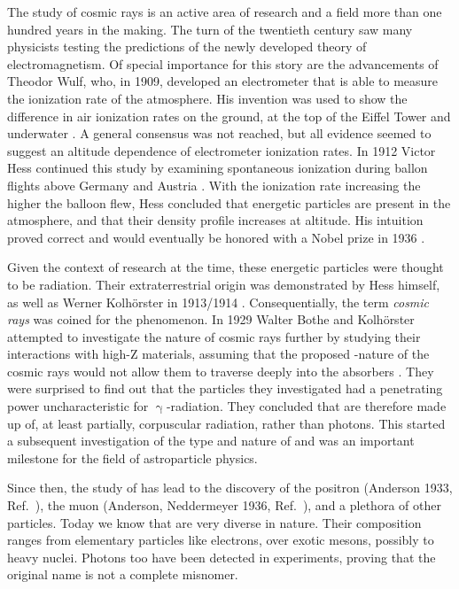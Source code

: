 The study of cosmic rays is an active area of research and a field more than 
one hundred years in the making. The turn of the twentieth century saw many 
physicists testing the predictions of the newly developed theory of 
electromagnetism. Of special importance for this story are the advancements of 
Theodor Wulf, who, in 1909, developed an electrometer that is able to measure 
the ionization rate of the atmosphere. His invention was used to show the 
difference in air ionization rates on the ground, at the top of the Eiffel 
Tower \cite{wulfBeobachtungenUberStrahlung1910} and underwater
\cite{paciniRadiazionePenetranteAlla1912}. A general consensus was not reached,
but all evidence seemed to suggest an altitude dependence of electrometer 
ionization rates. In 1912 Victor Hess continued this study by examining 
spontaneous ionization during ballon flights above Germany and Austria 
\cite{hessElektrischeLeitfaehigkeitAtmosphaere1926}. With the ionization rate 
increasing the higher the balloon flew, Hess concluded that energetic particles
are present in the atmosphere, and that their density profile increases at 
altitude. His intuition proved correct and would eventually be honored with a 
Nobel prize in 1936 \cite{nobelprizeoutreach2025NobelPrizePhysicsa}.

Given the context of research at the time, these energetic particles were
thought to be \EM radiation. Their extraterrestrial origin was demonstrated by 
Hess himself, as well as Werner Kolhörster in 1913/1914 
\cite{kolhorsterMeasurementsPenetratingRadiation1913}. Consequentially, the 
term \textit{cosmic rays} was coined for the phenomenon. In 1929 Walter Bothe 
and Kolhörster attempted to investigate the nature of cosmic rays further by 
studying their interactions with high-Z materials, assuming that the proposed
\EM-nature of the cosmic rays would not allow them to traverse deeply into the
absorbers \cite{botheNaturHohenstrahlung1929}. They were surprised to find out 
that the particles they investigated had a penetrating power uncharacteristic 
for $\upgamma$-radiation. They concluded that \CRs are therefore made up of, at
least partially, corpuscular radiation, rather than photons. This started a 
subsequent investigation of the type and nature of \CRs and was an important 
milestone for the field of astroparticle physics.

Since then, the study of \CRs has lead to the discovery of the positron 
(Anderson 1933, Ref.\ \cite{andersonPositiveElectron1933}), the muon (Anderson,
Neddermeyer 1936, Ref.\ \cite{andersonElementaryParticlesMatter1949}), and a 
plethora of other particles. Today we know that \CRs are very diverse in 
nature. Their composition ranges from elementary particles like electrons, over
exotic mesons, possibly to heavy nuclei. Photons too have been detected in \CR 
experiments, proving that the original name is not a complete misnomer.

